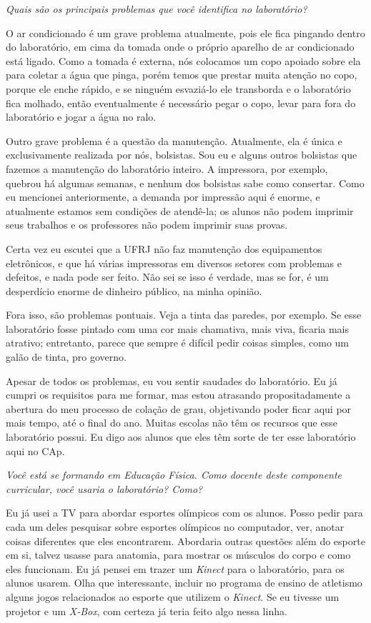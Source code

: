 \textit{Quais são os principais problemas que você identifica no laboratório?}

O ar condicionado é um grave problema atualmente, pois ele fica pingando dentro do laboratório, em cima da tomada onde o próprio aparelho de ar condicionado está ligado. Como a tomada é externa, nós colocamos um copo apoiado sobre ela para coletar a água que pinga, porém temos que prestar muita atenção no copo, porque ele enche rápido, e se ninguém esvaziá-lo ele transborda e o laboratório fica molhado, então eventualmente é necessário pegar o copo, levar para fora do laboratório e jogar a água no ralo.

Outro grave problema é a questão da manutenção. Atualmente, ela é única e exclusivamente realizada por nós, bolsistas. Sou eu e alguns outros bolsistas que fazemos a manutenção do laboratório inteiro. A impressora, por exemplo, quebrou há algumas semanas, e nenhum dos bolsistas sabe como consertar. Como eu mencionei anteriormente, a demanda por impressão aqui é enorme, e atualmente estamos sem condições de atendê-la; os alunos não podem imprimir seus trabalhos e os professores não podem imprimir suas provas.

Certa vez eu escutei que a UFRJ não faz manutenção dos equipamentos eletrônicos, e que há várias impressoras em diversos setores com problemas e defeitos, e nada pode ser feito. Não sei se isso é verdade, mas se for, é um desperdício enorme de dinheiro público, na minha opinião.

Fora isso, são problemas pontuais. Veja a tinta das paredes, por exemplo. Se esse laboratório fosse pintado com uma cor mais chamativa, mais viva, ficaria mais atrativo; entretanto, parece que sempre é difícil pedir coisas simples, como um galão de tinta, pro governo.

Apesar de todos os problemas, eu vou sentir saudades do laboratório. Eu já cumpri os requisitos para me formar, mas estou atrasando propositadamente a abertura do meu processo de colação de grau, objetivando poder ficar aqui por mais tempo, até o final do ano. Muitas escolas não têm os recursos que esse laboratório possui. Eu digo aos alunos que eles têm sorte de ter esse laboratório aqui no CAp.

\textit{Você está se formando em Educação Física. Como docente deste componente curricular, você usaria o laboratório? Como?}

Eu já usei a TV para abordar esportes olímpicos com os alunos. Posso pedir para cada um deles pesquisar sobre esportes olímpicos no computador, ver, anotar coisas diferentes que eles encontrarem. Abordaria outras questões além do esporte em si, talvez usasse para anatomia, para mostrar os músculos do corpo e como eles funcionam. Eu já pensei em trazer um \textit{Kinect} para o laboratório, para os alunos usarem. Olha que interessante, incluir no programa de ensino de atletismo alguns jogos relacionados ao esporte que utilizem o \textit{Kinect}. Se eu tivesse um projetor e um \textit{X-Box}, com certeza já teria feito algo nessa linha.


